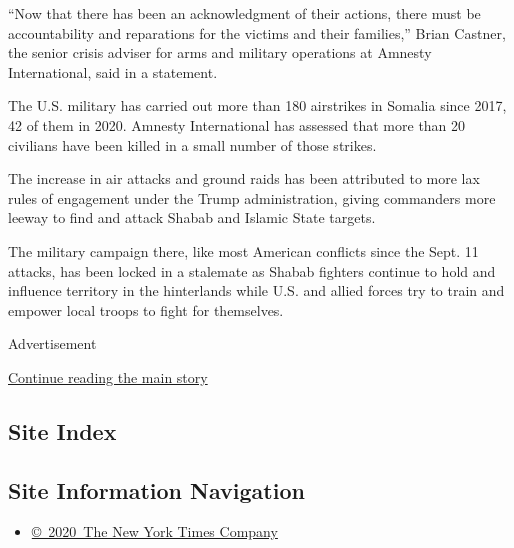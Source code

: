 ``Now that there has been an acknowledgment of their actions, there must
be accountability and reparations for the victims and their families,''
Brian Castner, the senior crisis adviser for arms and military
operations at Amnesty International, said in a statement.

The U.S. military has carried out more than 180 airstrikes in Somalia
since 2017, 42 of them in 2020. Amnesty International has assessed that
more than 20 civilians have been killed in a small number of those
strikes.

The increase in air attacks and ground raids has been attributed to more
lax rules of engagement under the Trump administration, giving
commanders more leeway to find and attack Shabab and Islamic State
targets.

The military campaign there, like most American conflicts since the
Sept. 11 attacks, has been locked in a stalemate as Shabab fighters
continue to hold and influence territory in the hinterlands while U.S.
and allied forces try to train and empower local troops to fight for
themselves.

Advertisement

\protect\hyperlink{after-bottom}{Continue reading the main story}

\hypertarget{site-index}{%
\subsection{Site Index}\label{site-index}}

\hypertarget{site-information-navigation}{%
\subsection{Site Information
Navigation}\label{site-information-navigation}}

\begin{itemize}
\tightlist
\item
  \href{https://help.nytimes3xbfgragh.onion/hc/en-us/articles/115014792127-Copyright-notice}{©~2020~The
  New York Times Company}
\end{itemize}

